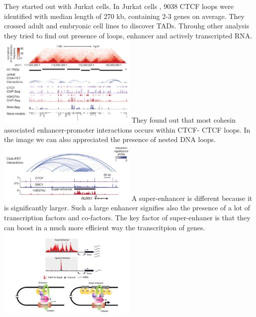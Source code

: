 They started out with Jurkat cells. In Jurkat cells , 9038 CTCF loops were identified with median length of 270 kb, containing 2-3 genes on average. They crossed adult and embryonic cell lines to discover TADs. Throuhg other analysis they tried to find out presence of loops, enhancer and actively transcripted RNA.
\includegraphics[width=0.5\textwidth]{../_resources/efdc44eea9ebe388b5a5a49cf2e3ce6c.png}
They found out that most cohesin associated enhancer-promoter interactions occurs within CTCF-
CTCF loops. In the image we can also appreciated the presence of nested DNA loops.
\includegraphics[width=0.5\textwidth]{../_resources/d0828d655b33d8b7576aed0621665948.png}
A super-enhancer is different because it is significantly larger. Such a large enhancer signifies also the presence of a lot of transcription factors and co-factors. The key factor of super-enhaner is that they can boost in a much more efficient way the transcritpion of genes.
\includegraphics[width=0.5\textwidth]{../_resources/802f178305ca61d2dd78b9be0e2d138b.png}

